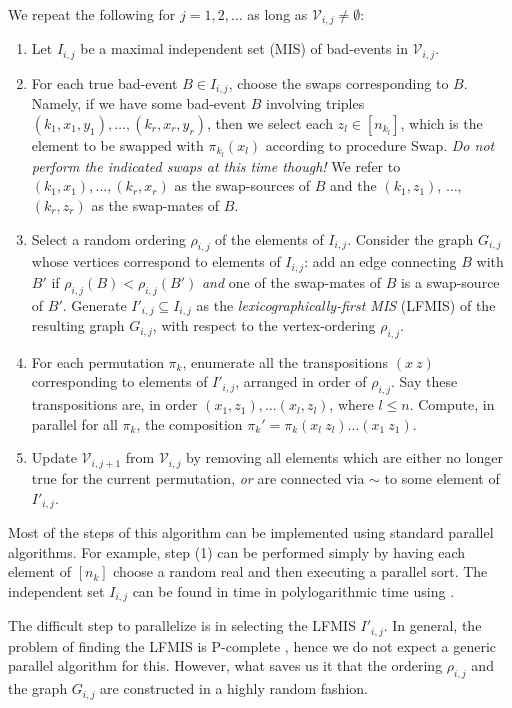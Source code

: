 \begin{enumerate}
\begin{enumerate}
We repeat the following for $j = 1, 2, \dots$ as long as $\mathcal V_{i,j} \neq \emptyset$:
\begin{enumerate}
\item[(4)] Let $I_{i,j}$ be a maximal independent set (MIS) of bad-events in $\mathcal V_{i,j}$.
\item[(5)] For each true bad-event $B \in I_{i,j}$, choose the swaps corresponding to $B$. Namely, if we have some bad-event $B$ involving triples $(k_1, x_1, y_1), \dots, (k_r, x_r, y_r)$, then we select each $z_l \in [n_{k_l}]$, which is the element to be swapped with $\pi_{k_l}(x_l)$ according to procedure Swap. \emph{Do not perform the indicated swaps at this time though!} 
 We refer to $(k_1, x_1), \dots, (k_r, x_r)$ as the swap-sources of $B$ and the $(k_1, z_1)$, $\dots$, $(k_r, z_r)$ as the swap-mates of $B$.
\item[(6)]  Select a random ordering $\rho_{i,j}$ of the elements of $I_{i,j}$. Consider the graph $G_{i,j}$ whose vertices correspond to elements of $I_{i,j}$: add an edge connecting $B$ with $B'$ if $\rho_{i,j}(B) < \rho_{i,j}(B')$ \emph{and} one of the swap-mates of $B$ is a swap-source of $B'$.
Generate $I'_{i,j} \subseteq I_{i,j}$ as the \emph{lexicographically-first MIS} (LFMIS) of the resulting graph $G_{i,j}$, with respect to the vertex-ordering $\rho_{i,j}$.
\item[(7)] For each permutation $\pi_k$, enumerate all the transpositions $(x \ z)$ corresponding to elements of $I'_{i,j}$, arranged in order of $\rho_{i,j}$.   Say these transpositions are, in order $(x_1, z_1), \dots (x_l, z_l)$, where $l \leq n$. Compute, in parallel for all $\pi_k$, the composition $\pi_k' = \pi_k (x_l \ z_l) \dots (x_1 \ z_1)$.
\item[(8)] Update $\mathcal V_{i,j+1}$ from $\mathcal V_{i,j}$ by removing all elements which are either no longer true for the current permutation, \emph{or} are connected via $\sim$ to some element of $I'_{i,j}$.
\end{enumerate}
\end{enumerate}
\end{enumerate}

Most of the steps of this algorithm can be implemented using standard parallel algorithms. For example, step (1) can be performed simply by having each element of $[n_k]$ choose a random real and then executing a parallel sort. The independent set $I_{i,j}$ can be found in time in polylogarithmic time using \cite{abi:mis,luby:mis}. 

The difficult step to parallelize is in selecting the LFMIS $I'_{i,j}$. In general, the problem of finding the LFMIS is P-complete \cite{lfmis-p}, hence we do not expect a generic parallel algorithm for this. However, what saves us it that the ordering $\rho_{i,j}$ and the graph $G_{i,j}$ are constructed in a highly random fashion. 

